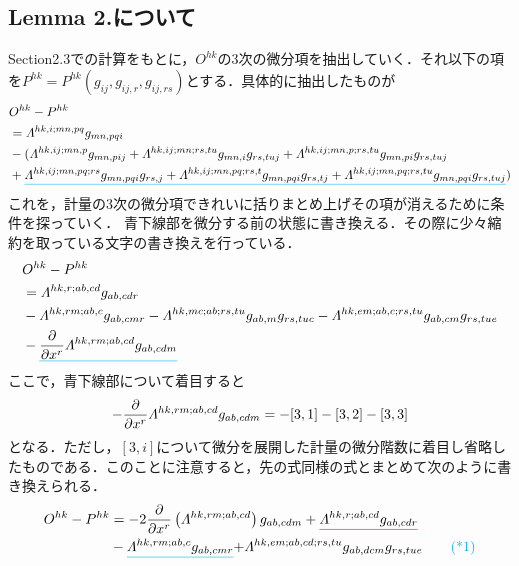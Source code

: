 \documentclass[main]{subfiles}
\begin{document}
\subsection{Lemma 2.について}
Section2.3での計算をもとに，\(O^{hk}\)の3次の微分項を抽出していく．それ以下の項を\(P^{hk}=P^{hk}(g_{ij}, g_{ij,r},g_{ij,rs})\)とする．具体的に抽出したものが
\begin{align*}
    & O^{hk}-P^{hk} \\
    &= \varLambda^{hk,i;mn,pq} g_{mn,pqi} \\
    &- ( \varLambda^{hk,ij;mn,p} g_{mn,pij} 
    + \varLambda^{hk,ij;mn;rs,tu} g_{mn,i}g_{rs,tuj} 
    + \varLambda^{hk,ij;mn,p;rs,tu} g_{mn,pi}g_{rs,tuj} \\
    &+\color{cyan}{\underline{\textcolor{black}{
    \varLambda^{hk,ij;mn,pq;rs} g_{mn,pqi}g_{rs,j} 
    +  \varLambda^{hk,ij;mn,pq;rs,t} g_{mn,pqi}g_{rs,tj}  
    +  \varLambda^{hk,ij;mn,pq;rs,tu} g_{mn,pqi}g_{rs,tuj} 
    }}}\textcolor{black})
\end{align*}
これを，計量の3次の微分項できれいに括りまとめ上げその項が消えるために条件を探っていく．
青下線部を微分する前の状態に書き換える．その際に少々縮約を取っている文字の書き換えを行っている．
\begin{align*}
    & O^{hk}-P^{hk} \\
    &= \varLambda^{hk,r;ab,cd} g_{ab,cdr} \\
    &-  \varLambda^{hk,rm;ab,c} g_{ab,cmr} 
    - \varLambda^{hk,mc;ab;rs,tu} g_{ab,m}g_{rs,tuc} 
    - \varLambda^{hk,em;ab,c;rs,tu} g_{ab,cm}g_{rs,tue} \\
    &-\color{cyan}{\underline{\textcolor{black}{
    \dfrac{\partial }{\partial x^r }\varLambda^{hk,rm;ab,cd} g_{ab,cdm}
    }}}
\end{align*}
ここで，青下線部について着目すると
\begin{equation*}
    -\dfrac{\partial }{\partial x^r }\varLambda^{hk,rm;ab,cd} g_{ab,cdm} = -[3,1] - [3,2] - [3,3]
\end{equation*}
となる．ただし，\([3,i]\)について微分を展開した計量の微分階数に着目し省略したものである．このことに注意すると，先の式同様の式とまとめて次のように書き換えられる．
\begin{align*}
    O^{hk}-P^{hk} 
    &= -2\dfrac{\partial }{\partial x^r }\left( \varLambda^{hk,rm;ab,cd} \right) g_{ab,cdm} + \color{red}{\underline{\textcolor{black}{\varLambda^{hk,r;ab,cd} g_{ab,cdr}}}} \\
    &-  \color{cyan}{\underline{\textcolor{black}{\varLambda^{hk,rm;ab,c} g_{ab,cmr}}}} 
    \textcolor{black}{
    + \varLambda^{hk,em;ab,cd;rs,tu} g_{ab,dcm}g_{rs,tue} }
    \label{op1} \tag{*1}
\end{align*}
\end{document}
